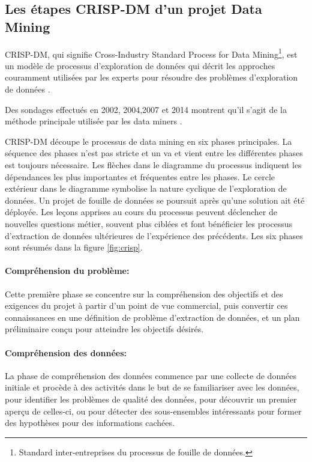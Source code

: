 	\subsection{Les étapes CRISP-DM d'un projet Data Mining}
	CRISP-DM, qui signifie Cross-Industry Standard Process for Data Mining\footnote{Standard inter-entreprises du processus de fouille de données.}, est un modèle de processus d'exploration de données qui décrit les approches couramment utilisées par les experts pour résoudre des problèmes d'exploration de données \cite{CRISP-DM}.\par 
	Des sondages effectués en 2002, 2004,2007 et 2014 montrent qu'il s'agit de la méthode principale utilisée par les data miners \cite{KDN}.\par
	
	CRISP-DM découpe le processus de data mining en six phases principales. La séquence des phases n'est pas stricte et un va et vient entre les différentes phases est toujours nécessaire. Les flèches dans le diagramme du processus indiquent les dépendances les plus importantes et fréquentes entre les phases. Le cercle extérieur dans le diagramme symbolise la nature cyclique de l'exploration de données. Un projet de fouille de données se poursuit après qu'une solution ait été déployée. Les leçons apprises au cours du processus peuvent déclencher de nouvelles questions métier, souvent plus ciblées et font bénéficier les processus d'extraction de données ultérieures de l'expérience des précédents. Les six phases sont résumés dans la figure \ref{fig:crisp}.
	\newpage
	\paragraph{Compréhension du problème:}
	Cette première phase se concentre sur la compréhension des objectifs et des exigences du projet à partir d'un point de vue commercial, puis convertir ces connaissances en une définition de problème d'extraction de données, et un plan préliminaire conçu pour atteindre les objectifs désirés.
	\paragraph{Compréhension des données:}
	La phase de compréhension des données commence par une collecte de données initiale et procède à des activités dans le but de se familiariser avec les données, pour identifier les problèmes de qualité des données, pour découvrir un premier aperçu de celles-ci, ou pour détecter des sous-ensembles intéressants pour former des hypothèses pour des informations cachées.

